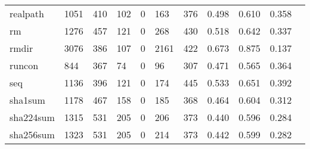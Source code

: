 \begin{longtable}{lp{1.10cm}p{1.10cm}p{1.10cm}p{1.10cm}p{1.10cm}p{1.10cm}p{1.10cm}p{1.10cm}p{1.10cm}p{1.10cm}}
realpath  &                   1051 &                                410 &                               102 &                                0 &                               163 &                             376 &                             0.498 &                                 0.610 &                               0.358 \\
rm        &                   1276 &                                457 &                               121 &                                0 &                               268 &                             430 &                             0.518 &                                 0.642 &                               0.337 \\
rmdir     &                   3076 &                                386 &                               107 &                                0 &                              2161 &                             422 &                             0.673 &                                 0.875 &                               0.137 \\
runcon    &                    844 &                                367 &                                74 &                                0 &                                96 &                             307 &                             0.471 &                                 0.565 &                               0.364 \\
seq       &                   1136 &                                396 &                               121 &                                0 &                               174 &                             445 &                             0.533 &                                 0.651 &                               0.392 \\
sha1sum   &                   1178 &                                467 &                               158 &                                0 &                               185 &                             368 &                             0.464 &                                 0.604 &                               0.312 \\
sha224sum &                   1315 &                                531 &                               205 &                                0 &                               206 &                             373 &                             0.440 &                                 0.596 &                               0.284 \\
sha256sum &                   1323 &                                531 &                               205 &                                0 &                               214 &                             373 &                             0.442 &                                 0.599 &                               0.282 \\

\end{longtable}
